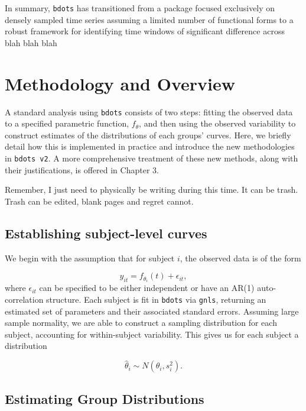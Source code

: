 \documentclass{article}
\newcommand{\xt}{\texttt}%
\begin{document}
In summary, \texttt{bdots} has transitioned from a package focused exclusively on densely sampled time series assuming a limited number of functional forms to a {\color{red} robust} framework for identifying time windows of significant difference across blah blah blah


\section{Methodology and Overview} 

A standard analysis using \xt{bdots} consists of two steps: fitting the observed data to a specified parametric function, $f_\theta$, and then using the observed variability to construct estimates of the distributions of each groups' curves.  Here, we briefly detail how this is implemented in practice and introduce the new methodologies in \xt{bdots v2}. A more comprehensive treatment of these new methods, along with their justifications, is offered in Chapter 3. 

Remember, I just need to physically be writing during this time. It can be trash. Trash can be edited, blank pages and regret cannot.

\subsection{Establishing subject-level curves}

We begin with the assumption that for subject $i$, the observed data is of the form

\begin{equation}\label{eq:mean_structure}
y_{it} = f_{\theta_i}(t) + \epsilon_{it},
\end{equation}
where $\epsilon_{it}$ can be specified to be either independent or have an AR(1) auto-correlation structure. Each subject is fit in \xt{bdots} via \xt{gnls}, returning an estimated set of parameters and their associated standard errors. Assuming large sample normality, we are able to construct a sampling distribution for each subject, accounting for within-subject variability. This gives us for each subject a distribution

\begin{equation}
\hat{\theta}_i \sim N(\theta_i, s_i^2).
\end{equation}

\subsection{Estimating Group Distributions}
\end{document}
